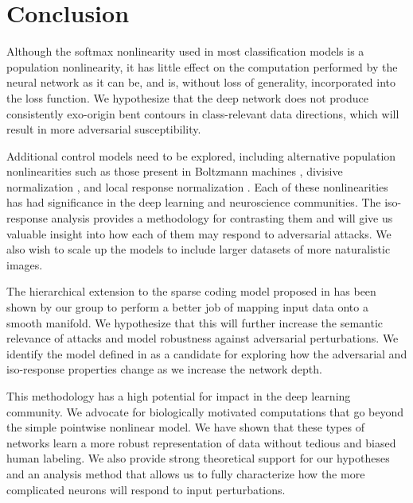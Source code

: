 



\section{Conclusion}
Although the softmax nonlinearity used in most classification models is a population nonlinearity, it has little effect on the computation performed by the neural network as it can be, and is, without loss of generality, incorporated into the loss function. We hypothesize that the deep network does not produce consistently exo-origin bent contours in class-relevant data directions, which will result in more adversarial susceptibility.

Additional control models need to be explored, including alternative population nonlinearities such as those present in Boltzmann machines \parencite{salakhutdinov2009deep}, divisive normalization \parencite{balle2016end}, and local response normalization \parencite{krizhevsky2012imagenet}. Each of these nonlinearities has had significance in the deep learning and neuroscience communities. The iso-response analysis provides a methodology for contrasting them and will give us valuable insight into how each of them may respond to adversarial attacks. We also wish to scale up the models to include larger datasets of more naturalistic images. 

The hierarchical extension to the sparse coding model proposed in \parencite{chen2018sparse} has been shown by our group to perform a better job of mapping input data onto a smooth manifold. We hypothesize that this will further increase the semantic relevance of attacks and model robustness against adversarial perturbations. We identify the model defined in \parencite{chen2018sparse} as a candidate for exploring how the adversarial and iso-response properties change as we increase the network depth.

This methodology has a high potential for impact in the deep learning community. We advocate for biologically motivated computations that go beyond the simple pointwise nonlinear model. We have shown that these types of networks learn a more robust representation of data without tedious and biased human labeling. We also provide strong theoretical support for our hypotheses and an analysis method that allows us to fully characterize how the more complicated neurons will respond to input perturbations.